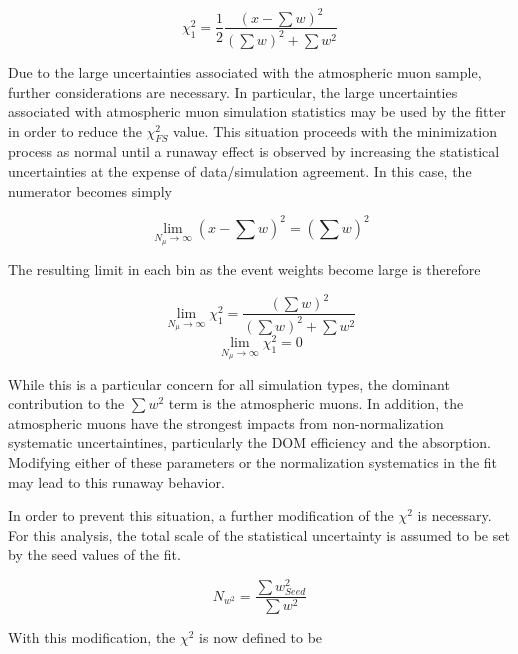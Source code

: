 \label{eqn:mchi2}
\begin{equation}
	\chi^2_{1} =\frac{1}{2}\frac{\left(x-\sum w\right)^2}{\left(\sum{w}\right)^2 + \sum{w^2}}
\end{equation}		

Due to the large uncertainties associated with the atmospheric muon sample, further considerations are necessary.
In particular, the large uncertainties associated with atmospheric muon simulation statistics may be used by the fitter in order to reduce the $\chi^2_{FS}$ value.
This situation proceeds with the minimization process as normal until a runaway effect is observed by increasing the statistical uncertainties at the expense of data/simulation agreement.
In this case, the numerator becomes simply

\label{eqn:mchi2_num}
\begin{equation}
	\lim_{N_{\mu}\rightarrow\infty} \left(x-\sum w\right)^2 = \left(\sum w\right)^2
\end{equation}

The resulting limit in each bin as the event weights become large is therefore

\label{eqn:mchi2_lim}
\begin{equation}
	\lim_{N_{\mu}\rightarrow\infty} \chi^2_{1} =  \frac{\left(\sum w\right)^2}{\left(\sum{w}\right)^2 + \sum{w^2}}
\end{equation}
\begin{equation}
	\lim_{N_{\mu}\rightarrow\infty} \chi^2_{1} = 0
\end{equation}

While this is a particular concern for all simulation types, the dominant contribution to the $\sum{w^2}$ term is the atmospheric muons. 
In addition, the atmospheric muons have the strongest impacts from non-normalization systematic uncertaintines, particularly the DOM efficiency and the absorption.
Modifying either of these parameters or the normalization systematics in the fit may lead to this runaway behavior.

In order to prevent this situation, a further modification of the $\chi^2$ is necessary.
For this analysis, the total scale of the statistical uncertainty is assumed to be set by the seed values of the fit.

\label{eqn:w2_constant}
\begin{equation}
	N_{w^2} = \frac{\sum{w^2_{Seed}}}{\sum{w^2}}
\end{equation}

With this modification, the $\chi^2$ is now defined to be 

